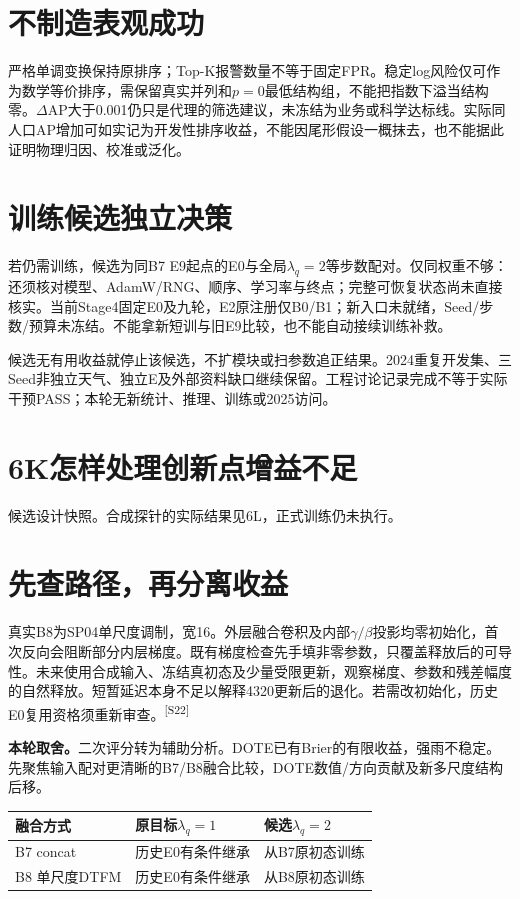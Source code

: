 \documentclass[UTF8,10.5pt,a4paper,fontset=none]{ctexart}
\newcommand{\evi}[1]{\textsuperscript{\color{muted}[#1]}}
\newcommand{\pageheading}[2]{\clearpage\section*{#1}\textcolor{muted}{#2}\par\vspace{3pt}}
\begin{document}
\section*{不制造表观成功}
严格单调变换保持原排序；Top-K报警数量不等于固定FPR。稳定log风险仅可作为数学等价排序，需保留真实并列和$p=0$最低结构组，不能把指数下溢当结构零。$\Delta$AP大于0.001仍只是代理的筛选建议，未冻结为业务或科学达标线。实际同人口AP增加可如实记为开发性排序收益，不能因尾形假设一概抹去，也不能据此证明物理归因、校准或泛化。

\section*{训练候选独立决策}
若仍需训练，候选为同B7 E9起点的E0与全局$\lambda_q=2$等步数配对。仅同权重不够：还须核对模型、AdamW/RNG、顺序、学习率与终点；完整可恢复状态尚未直接核实。当前Stage4固定E0及九轮，E2原注册仅B0/B1；新入口未就绪，Seed/步数/预算未冻结。不能拿新短训与旧E9比较，也不能自动接续训练补救。

候选无有用收益就停止该候选，不扩模块或扫参数追正结果。2024重复开发集、三Seed非独立天气、独立E及外部资料缺口继续保留。工程讨论记录完成不等于实际干预PASS；本轮无新统计、推理、训练或2025访问。

\pageheading{6K\quad 怎样处理创新点增益不足}{候选设计快照。合成探针的实际结果见6L，正式训练仍未执行。}
\section*{先查路径，再分离收益}
真实B8为SP04单尺度调制，宽16。外层融合卷积及内部$\gamma/\beta$投影均零初始化，首次反向会阻断部分内层梯度。既有梯度检查先手填非零参数，只覆盖释放后的可导性。未来使用合成输入、冻结真初态及少量受限更新，观察梯度、参数和残差幅度的自然释放。短暂延迟本身不足以解释4320更新后的退化。若需改初始化，历史E0复用资格须重新审查。\evi{S22}

\textbf{本轮取舍。}二次评分转为辅助分析。DOTE已有Brier的有限收益，强雨不稳定。先聚焦输入配对更清晰的B7/B8融合比较，DOTE数值/方向贡献及新多尺度结构后移。

\begin{tabularx}{\textwidth}{@{}p{3.5cm}X X@{}}
\toprule 融合方式 & 原目标$\lambda_q=1$ & 候选$\lambda_q=2$\\\midrule
B7 concat & 历史E0有条件继承 & 从B7原初态训练\\
B8 单尺度DTFM & 历史E0有条件继承 & 从B8原初态训练\\
\bottomrule
\end{tabularx}
\end{document}
